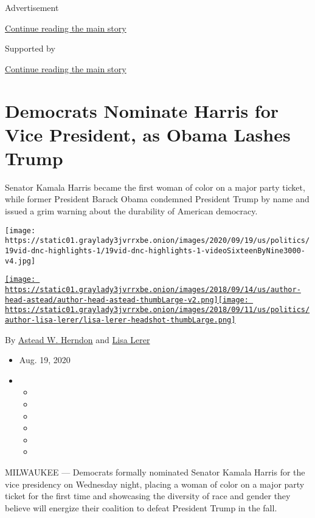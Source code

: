 Advertisement

\protect\hyperlink{after-top}{Continue reading the main story}

Supported by

\protect\hyperlink{after-sponsor}{Continue reading the main story}

\hypertarget{democrats-nominate-harris-for-vice-president-as-obama-lashes-trump}{%
\section{Democrats Nominate Harris for Vice President, as Obama Lashes
Trump}\label{democrats-nominate-harris-for-vice-president-as-obama-lashes-trump}}

Senator Kamala Harris became the first woman of color on a major party
ticket, while former President Barack Obama condemned President Trump by
name and issued a grim warning about the durability of American
democracy.

\texttt{[image: https://static01.graylady3jvrrxbe.onion/images/2020/09/19/us/politics/19vid-dnc-highlights-1/19vid-dnc-highlights-1-videoSixteenByNine3000-v4.jpg]}

\href{https://www.nytimes3xbfgragh.onion/by/astead-w-herndon}{\texttt{[image: https://static01.graylady3jvrrxbe.onion/images/2018/09/14/us/author-head-astead/author-head-astead-thumbLarge-v2.png]}}\href{https://www.nytimes3xbfgragh.onion/by/lisa-lerer}{\texttt{[image: https://static01.graylady3jvrrxbe.onion/images/2018/09/11/us/politics/author-lisa-lerer/lisa-lerer-headshot-thumbLarge.png]}}

By \href{https://www.nytimes3xbfgragh.onion/by/astead-w-herndon}{Astead
W. Herndon} and
\href{https://www.nytimes3xbfgragh.onion/by/lisa-lerer}{Lisa Lerer}

\begin{itemize}
\item
  Aug. 19, 2020
\item
  \begin{itemize}
  \item
  \item
  \item
  \item
  \item
  \item
  \end{itemize}
\end{itemize}

MILWAUKEE --- Democrats formally nominated Senator Kamala Harris for the
vice presidency on Wednesday night, placing a woman of color on a major
party ticket for the first time and showcasing the diversity of race and
gender they believe will energize their coalition to defeat President
Trump in the fall.

